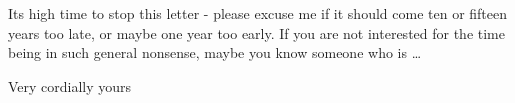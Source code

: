 Its high time to stop this letter - please excuse me if it should come ten or fifteen years too late, or maybe one year too early. If you are not interested for the time being in such general nonsense, maybe you know someone who is \ldots

Very cordially yours\\
\\
